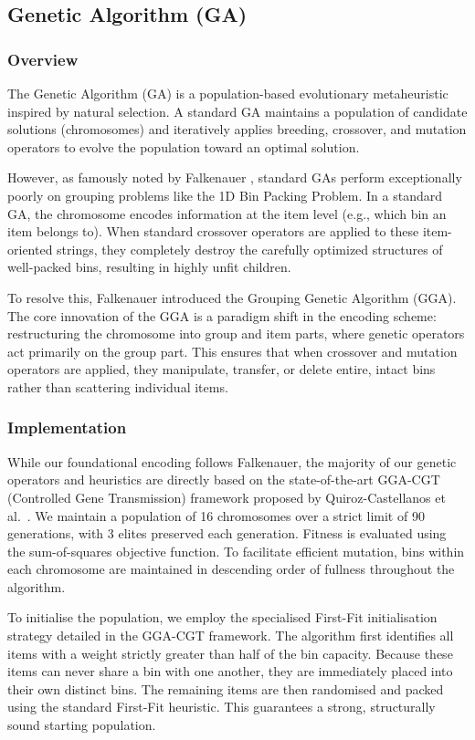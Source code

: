 \documentclass[11pt]{article}
\begin{document}
\subsection{Genetic Algorithm (GA)}

\subsubsection{Overview}
The Genetic Algorithm (GA) is a population-based evolutionary metaheuristic inspired by natural selection. A standard GA maintains a population of candidate solutions (chromosomes) and iteratively applies breeding, crossover, and mutation operators to evolve the population toward an optimal solution. 

However, as famously noted by Falkenauer \cite{gga}, standard GAs perform exceptionally poorly on grouping problems like the 1D Bin Packing Problem. In a standard GA, the chromosome encodes information at the item level (e.g., which bin an item belongs to). When standard crossover operators are applied to these item-oriented strings, they completely destroy the carefully optimized structures of well-packed bins, resulting in highly unfit children. 

To resolve this, Falkenauer introduced the Grouping Genetic Algorithm (GGA). The core innovation of the GGA is a paradigm shift in the encoding scheme: restructuring the chromosome into group and item parts, where genetic operators act primarily on the group part. This ensures that when crossover and mutation operators are applied, they manipulate, transfer, or delete entire, intact bins rather than scattering individual items.

\subsubsection{Implementation}
While our foundational encoding follows Falkenauer, the majority of our 
genetic operators and heuristics are directly based on the state-of-the-art 
GGA-CGT (Controlled Gene Transmission) framework proposed by 
Quiroz-Castellanos et al.\ \cite{quirozca}. We maintain a population of 16 
chromosomes over a strict limit of 90 generations, with 3 elites preserved 
each generation. Fitness is evaluated using the sum-of-squares objective 
function. To facilitate efficient mutation, bins within each chromosome are 
maintained in descending order of fullness throughout the algorithm.

To initialise the population, we employ the specialised First-Fit 
initialisation strategy detailed in the GGA-CGT framework. The algorithm 
first identifies all items with a weight strictly greater than half of the 
bin capacity. Because these items can never share a bin with one another, 
they are immediately placed into their own distinct bins. The remaining items 
are then randomised and packed using the standard First-Fit heuristic. This 
guarantees a strong, structurally sound starting population.
\end{document}
